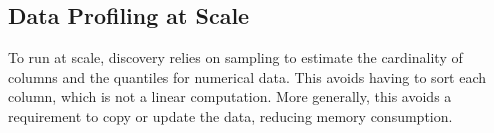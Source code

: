 %
%
%
%
%

\subsection{Data Profiling at Scale}

To run at scale, discovery relies on sampling to estimate the cardinality of
columns and the quantiles for numerical data. This avoids having to sort each
column, which is not a linear computation.  More generally, this avoids a
requirement to copy or update the data, reducing memory consumption.

